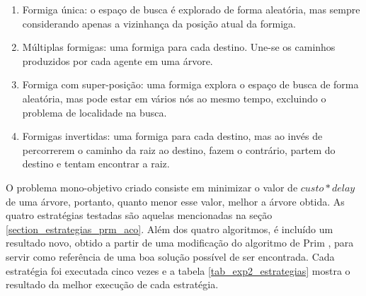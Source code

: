 \begin{enumerate}
	\item Formiga única: o espaço de busca é explorado de forma aleatória, mas sempre considerando apenas a vizinhança da posição atual da formiga.
	\item Múltiplas formigas: uma formiga para cada destino. Une-se os caminhos produzidos por cada agente em uma árvore.
	\item Formiga com super-posição: uma formiga explora o espaço de busca de forma aleatória, mas pode estar em vários nós ao mesmo tempo, excluindo o problema de localidade na busca.
	\item Formigas invertidas: uma formiga para cada destino, mas ao invés de percorrerem o caminho da raiz ao destino, fazem o contrário, partem do destino e tentam encontrar a raiz.
\end{enumerate}

O problema mono-objetivo criado consiste em minimizar o valor de $custo * delay$ de uma árvore, portanto, quanto menor esse valor, melhor a árvore obtida. As quatro estratégias testadas são aquelas mencionadas na seção \ref{section_estrategias_prm_aco}. Além dos quatro algoritmos, é incluído um resultado novo, obtido a partir de uma modificação do algoritmo de Prim \cite{Prim1957}, para servir como referência de uma boa solução possível de ser encontrada. Cada estratégia foi executada cinco vezes e a tabela \ref{tab_exp2_estrategias} mostra o resultado da melhor execução de cada estratégia.

